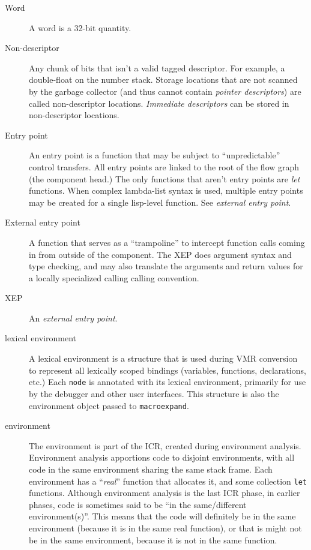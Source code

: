 \begin{description}
\item[Word]
A word is a 32-bit quantity.

\item[Non-descriptor]
Any chunk of bits that isn't a valid tagged descriptor.  For example, a
double-float on the number stack.  Storage locations that are not scanned by
the garbage collector (and thus cannot contain {\it pointer descriptors}) are
called non-descriptor locations.  {\it Immediate descriptors} can be stored in
non-descriptor locations.


\item[Entry point] An entry point is a function that may be subject to
``unpredictable'' control transfers.  All entry points are linked to the root
of the flow graph (the component head.)  The only functions that aren't entry
points are {\it let} functions.  When complex lambda-list syntax is used,
multiple entry points may be created for a single lisp-level function.
See {\it external entry point}.

\item[External entry point] A function that serves as a ``trampoline'' to
intercept function calls coming in from outside of the component.  The XEP does
argument syntax and type checking, and may also translate the arguments and
return values for a locally specialized calling calling convention.

\item[XEP] An {\it external entry point}.

\item[lexical environment] A lexical environment is a structure that is used
during VMR conversion to represent all lexically scoped bindings (variables,
functions, declarations, etc.)  Each {\tt node} is annotated with its lexical
environment, primarily for use by the debugger and other user interfaces.  This
structure is also the environment object passed to {\tt macroexpand}.

\item[environment] The environment is part of the ICR, created during
environment analysis.  Environment analysis apportions code to disjoint
environments, with all code in the same environment sharing the same stack
frame.  Each environment has a ``{\it real}'' function that allocates it, and
some collection {\tt let} functions.   Although environment analysis is the
last ICR phase, in earlier phases, code is sometimes said to be ``in the
same/different environment(s)''.  This means that the code will definitely be
in the same environment (because it is in the same real function), or that is
might not be in the same environment, because it is not in the same function.


\end{description}
